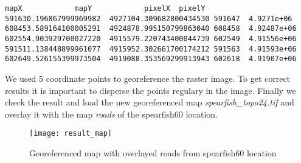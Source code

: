 \begin{verbatim}
mapX    		mapY    		pixelX  pixelY
591630.196867999969982  4927104.309682800434530 591647  4.9271e+06
608453.589164100005291  4924878.995150799863040 608458  4.92487e+06
602554.903929700027220  4915579.220743400044739 602549  4.91556e+06
591511.138448899961077  4915952.302661700174212 591563  4.91593e+06
602649.526155399973504  4919088.353569299913943 602618  4.91907e+06
\end{verbatim} 

We used 5 coordinate points to georeference the raster image. To get correct results 
it is important to disperse the points regulary in the image. Finally we check the result and load 
the new georeferenced map \textsl{spearfish\_topo24.tif} and overlay it with the map \textsl{roads} 
of the spearfish60 location.

\begin{figure}[ht]
\begin{center}
  \caption{Georeferenced map with overlayed roads from spearfish60 location}\label{fig:result_map}\smallskip
  \texttt{[image: result\_map]}
\end{center}
\end{figure}







